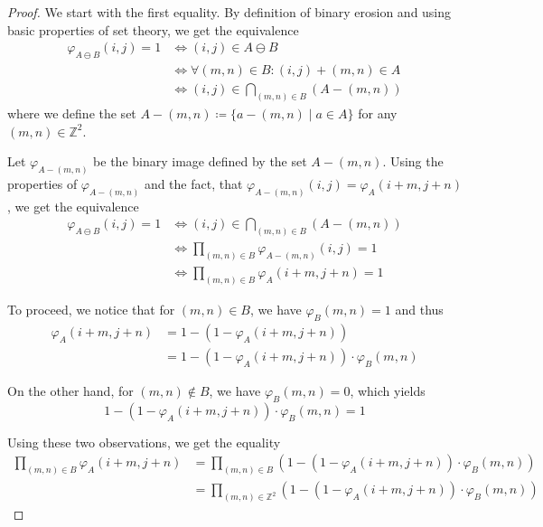 \documentclass[a4paper,12pt]{article}
\theoremstyle{plain}
\theoremstyle{definition}
\theoremstyle{remark}
\begin{document}
\begin{proof}
	We start with the first equality. By definition of binary erosion and using basic properties of set theory, we get the equivalence
	\begin{align*}
		\varphi_{A \ominus B}(i, j) = 1 &\Leftrightarrow (i, j) \in A \ominus B \\
		&\Leftrightarrow \forall (m, n) \in B: (i, j) + (m, n) \in A \\
		&\Leftrightarrow (i, j) \in \bigcap_{(m, n) \in B} ( A - (m, n) )
	\end{align*}
	where we define the set $A - (m, n) \coloneqq \{ a - (m, n) \mid a \in A \}$ for any $(m, n) \in \mathbb{Z}^2$.
	
	Let $\varphi_{A - (m, n)}$ be the binary image defined by the set $A - (m, n)$. Using the properties of $\varphi_{A - (m, n)}$ and the fact, that $\varphi_{A - (m, n)}(i, j) = \varphi_A(i + m, j + n)$, we get the equivalence
	\begin{align*}
		\varphi_{A \ominus B}(i, j) = 1 &\Leftrightarrow (i, j) \in \bigcap_{(m, n) \in B} ( A - (m, n) ) \\
		&\Leftrightarrow \prod_{(m, n) \in B} \varphi_{A - (m, n)}(i, j) = 1 \\
		&\Leftrightarrow \prod_{(m, n) \in B} \varphi_A(i + m, j + n) = 1
	\end{align*}
	
	To proceed, we notice that for $(m, n) \in B$, we have $\varphi_B(m, n) = 1$ and thus
	\begin{align*}
		\varphi_A(i + m, j + n) &= 1 - ( 1 - \varphi_A(i + m, j + n)) \\
		&= 1 - ( 1 - \varphi_A(i + m, j + n)) \cdot \varphi_B(m, n)
	\end{align*}
	
	On the other hand, for $(m, n) \notin B$, we have $\varphi_B(m, n) = 0$, which yields
	\begin{equation*}
		1 - ( 1 - \varphi_A(i + m, j + n)) \cdot \varphi_B(m, n) = 1
	\end{equation*}
	
	Using these two observations, we get the equality
	\begin{align*}
		\prod_{(m, n) \in B} \varphi_A(i + m, j + n) &= \prod_{(m, n) \in B} ( 1 - ( 1 - \varphi_A(i + m, j + n)) \cdot \varphi_B(m, n) ) \\
		&= \prod_{(m, n) \in \mathbb{Z}^2} ( 1 - ( 1 - \varphi_A(i + m, j + n) ) \cdot \varphi_B(m, n) )
	\end{align*}
	

\end{proof}
\end{document}
